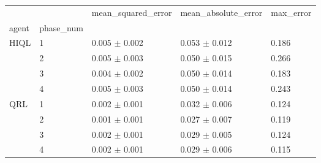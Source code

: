 \begin{tabular}{lllll}
\toprule
 &  & mean_squared_error & mean_absolute_error & max_error \\
agent & phase_num &  &  &  \\
\midrule
\multirow[t]{4}{*}{HIQL} & 1 & 0.005 $\pm$ 0.002 & 0.053 $\pm$ 0.012 & 0.186 \\
 & 2 & 0.005 $\pm$ 0.003 & 0.050 $\pm$ 0.015 & 0.266 \\
 & 3 & 0.004 $\pm$ 0.002 & 0.050 $\pm$ 0.014 & 0.183 \\
 & 4 & 0.005 $\pm$ 0.003 & 0.050 $\pm$ 0.014 & 0.243 \\
\cline{1-5}
\multirow[t]{4}{*}{QRL} & 1 & 0.002 $\pm$ 0.001 & 0.032 $\pm$ 0.006 & 0.124 \\
 & 2 & 0.001 $\pm$ 0.001 & 0.027 $\pm$ 0.007 & 0.119 \\
 & 3 & 0.002 $\pm$ 0.001 & 0.029 $\pm$ 0.005 & 0.124 \\
 & 4 & 0.002 $\pm$ 0.001 & 0.029 $\pm$ 0.006 & 0.115 \\
\cline{1-5}
\bottomrule
\end{tabular}
